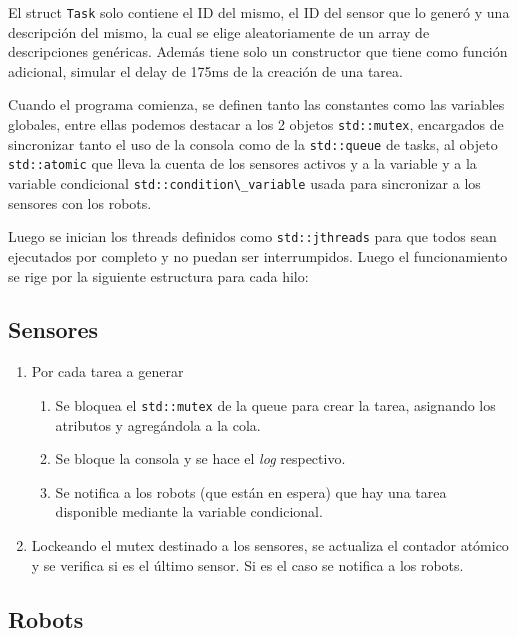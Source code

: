 \documentclass[11pt, a4paper]{article}
\begin{document}
\begin{multicols}{2}
El struct \lstinline|Task| solo contiene el ID del mismo, el ID del
sensor que lo generó y una descripción del mismo, la cual se elige aleatoriamente
de un array de descripciones genéricas. Además tiene solo un constructor que tiene
como función adicional, simular el delay de 175ms de la creación de una tarea.

Cuando el programa comienza, se definen tanto las constantes como las variables
globales, entre ellas podemos destacar a los 2 objetos \lstinline|std::mutex|, encargados
de sincronizar tanto el uso de la consola como de la \lstinline|std::queue| de tasks,
al objeto \lstinline|std::atomic| que lleva la cuenta de los sensores activos y a la variable
y a la variable condicional \lstinline|std::condition\_variable| usada para sincronizar a
los sensores con los robots.

Luego se inician los threads definidos como \lstinline|std::jthreads| para que todos sean
ejecutados por completo y no puedan ser interrumpidos. Luego el funcionamiento se rige por 
la siguiente estructura para cada hilo:

\subsection{Sensores}

\begin{enumerate}[label=\Roman*.]
    \item Por cada tarea a generar 
    \begin{enumerate}[label=\roman*.]
        \item Se bloquea el \lstinline|std::mutex| de la queue para crear la tarea,
        asignando los atributos y agregándola a la cola.
        \item Se bloque la consola y se hace el \textit{log} respectivo.
        \item Se notifica a los robots (que están en espera) que hay una tarea disponible
        mediante la variable condicional.
    \end{enumerate}
    \item Lockeando el mutex destinado a los sensores, se actualiza el contador atómico y se 
    verifica si es el último sensor. Si es el caso se notifica a los robots.
\end{enumerate}

\subsection{Robots}


\end{multicols}
\end{document}
